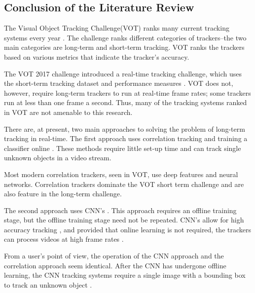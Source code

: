   \subsection{Conclusion of the Literature Review}
    The Visual Object Tracking Challenge(VOT) ranks many current tracking systems every year \cite{VOT2017, Kristan2020a}.
    The challenge ranks different categories of trackers--the two main categories are long-term and short-term tracking.
    VOT ranks the trackers based on various metrics that indicate the tracker's accuracy.

    The VOT 2017 challenge introduced a real-time tracking challenge, which uses the short-term tracking dataset and performance measures \cite{Kristan2020a}.
    VOT does not, however, require long-term trackers to run at real-time frame rates; some trackers run at less than one frame a second.
    Thus, many of the tracking systems ranked in VOT are not amenable to this research.

    There are, at present, two main approaches to solving the problem of long-term tracking in real-time.
    The first approach uses correlation tracking and training a classifier online \cite{Ma2015Correlation, Enriques2014, Kalal2011}.
    These methods require little set-up time and can track single unknown objects in a video stream.
    
    Most modern correlation trackers, seen in VOT, use deep features and neural networks.
    Correlation trackers dominate the VOT short term challenge and are also feature in the long-term challenge.

    The second approach uses CNN's \cite{bertinetto2016}.
    This approach requires an offline training stage, but the offline training stage need not be repeated.
    CNN's allow for high accuracy tracking \cite{CNNTracking, bertinetto2016}, and provided that online learning is not required, the trackers can process videos at high frame rates \cite{Kristan2020a}.

    From a user's point of view, the operation of the CNN approach and the correlation approach seem identical.
    After the CNN has undergone offline learning, the CNN tracking systems require a single image with a bounding box to track an unknown object \cite{CNNTracking, bertinetto2016}.
